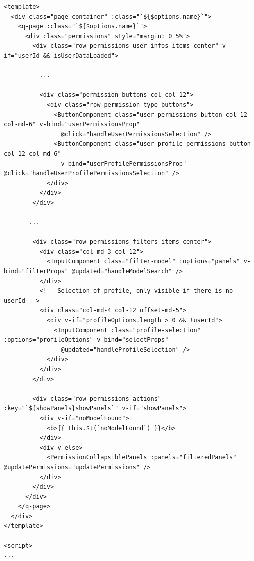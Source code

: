 \documentclass[a4paper, 12pt]{book}
\begin{document}
\begin{lstlisting}[caption=Implementazione di Permissions.vue]
<template>
  <div class="page-container" :class="`${$options.name}`">
    <q-page :class="`${$options.name}`">
      <div class="permissions" style="margin: 0 5%">
        <div class="row permissions-user-infos items-center" v-if="userId && isUserDataLoaded">

          ...

          <div class="permission-buttons-col col-12">
            <div class="row permission-type-buttons">
              <ButtonComponent class="user-permissions-button col-12 col-md-6" v-bind="userPermissionsProp"
                @click="handleUserPermissionsSelection" />
              <ButtonComponent class="user-profile-permissions-button col-12 col-md-6"
                v-bind="userProfilePermissionsProp" @click="handleUserProfilePermissionsSelection" />
            </div>
          </div>
        </div>

       ...

        <div class="row permissions-filters items-center">
          <div class="col-md-3 col-12">
            <InputComponent class="filter-model" :options="panels" v-bind="filterProps" @updated="handleModelSearch" />
          </div>
          <!-- Selection of profile, only visible if there is no userId -->
          <div class="col-md-4 col-12 offset-md-5">
            <div v-if="profileOptions.length > 0 && !userId">
              <InputComponent class="profile-selection" :options="profileOptions" v-bind="selectProps"
                @updated="handleProfileSelection" />
            </div>
          </div>
        </div>

        <div class="row permissions-actions" :key="`${showPanels}showPanels`" v-if="showPanels">
          <div v-if="noModelFound">
            <b>{{ this.$t(`noModelFound`) }}</b>
          </div>
          <div v-else>
            <PermissionCollapsiblePanels :panels="filteredPanels" @updatePermissions="updatePermissions" />
          </div>
        </div>
      </div>
    </q-page>
  </div>
</template>

<script>
...


\end{lstlisting}
\end{document}
